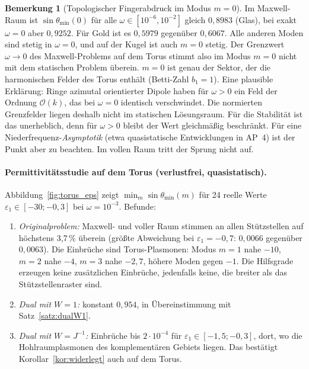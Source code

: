 \documentclass[11pt, a4paper]{article}
\theoremstyle{plain}
\theoremstyle{definition}
\newtheorem{bemerkung}[satz]{Bemerkung}
\newcommand{\status}[1]{\hfill{\small\sffamily[#1]}}
\begin{document}
\begin{bemerkung}[Topologischer Fingerabdruck im Modus $m=0$]\label{bem:m0}
\status{numerische Beobachtung}
Im Maxwell-Raum ist $\sin\theta_{\min}(0)$ für alle $\omega\in[10^{-6},10^{-2}]$
gleich $0{,}8983$ (Glas), bei exakt $\omega=0$ aber $0{,}9252$. Für Gold ist es
$0{,}5979$ gegenüber $0{,}6067$. Alle anderen Moden sind stetig in $\omega=0$, und
auf der Kugel ist auch $m=0$ stetig. Der Grenzwert $\omega\to0$ des Maxwell-Problems
auf dem Torus stimmt also im Modus $m=0$ nicht mit dem statischen Problem überein.
$m=0$ ist genau der Sektor, der die harmonischen Felder des Torus enthält (Betti-Zahl
$b_1=1$). Eine plausible Erklärung: Ringe azimutal orientierter Dipole haben für
$\omega>0$ ein Feld der Ordnung $\mathcal{O}(k)$, das bei $\omega=0$ identisch
verschwindet. Die normierten Grenzfelder liegen deshalb nicht im statischen
Lösungsraum. Für die Stabilität ist das unerheblich, denn für $\omega>0$ bleibt der
Wert gleichmäßig beschränkt. Für eine Niederfrequenz-\emph{Asymptotik} (etwa
quasistatische Entwicklungen in AP~4) ist der Punkt aber zu beachten. Im vollen
Raum tritt der Sprung nicht auf.
\end{bemerkung}

\paragraph{Permittivitätsstudie auf dem Torus (verlustfrei, quasistatisch).}
Abbildung~\ref{fig:torus_eps} zeigt $\min_m\sin\theta_{\min}(m)$ für 24 reelle Werte
$\varepsilon_1\in[-30;-0{,}3]$ bei $\omega=10^{-3}$. Befunde:
\begin{enumerate}[leftmargin=*]
  \item \emph{Originalproblem:} Maxwell- und voller Raum stimmen an allen
    Stützstellen auf höchstens 3{,}7\,\% überein (größte Abweichung bei
    $\varepsilon_1=-0{,}7$: $0{,}0066$ gegenüber $0{,}0063$). Die Einbrüche sind Torus-Plasmonen: Modus $m=1$ nahe
    $-10$, $m=2$ nahe $-4$, $m=3$ nahe $-2{,}7$, höhere Moden gegen $-1$. Die
    Hilfsgrade erzeugen keine zusätzlichen Einbrüche, jedenfalls keine, die breiter
    als das Stützstellenraster sind.
  \item \emph{Dual mit $W=1$:} konstant $0{,}954$, in Übereinstimmung mit
    Satz~\ref{satz:dualW1}.
  \item \emph{Dual mit $W=J^{-1}$:} Einbrüche bis $2\cdot10^{-4}$ für
    $\varepsilon_1\in[-1{,}5;-0{,}3]$, dort, wo die Hohlraumplasmonen des
    komplementären Gebiets liegen. Das bestätigt Korollar~\ref{kor:widerlegt} auch
    auf dem Torus.
\end{enumerate}
\end{document}
